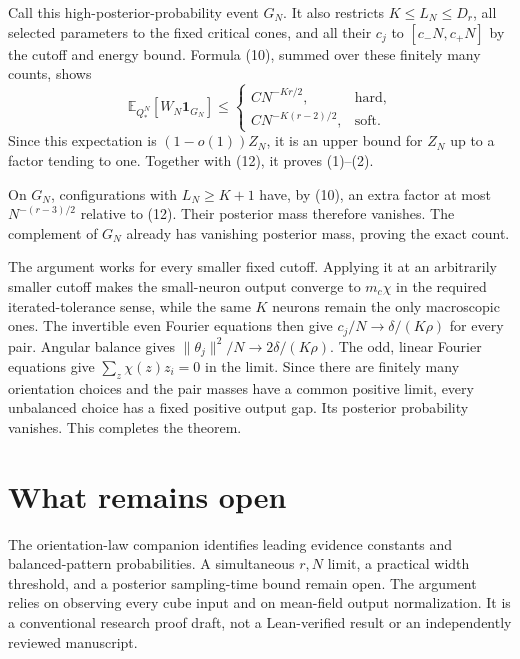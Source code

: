 \documentclass[11pt]{article}
\newcommand{\E}{\mathbb E}\newcommand{\Pp}{\mathbb P}
\newcommand{\one}{\mathbf1}
\begin{document}
Call this high-posterior-probability event $G_N$. It also restricts
$K\le L_N\le D_r$, all selected parameters to the fixed critical
cones, and all their $c_j$ to $[c_-N,c_+N]$ by the cutoff and energy
bound. Formula (10), summed over these finitely many counts, shows
\[
 \E_{Q_*^N}[W_N\one_{G_N}]\le
 \begin{cases}
 CN^{-Kr/2},&\text{hard},\\
 CN^{-K(r-2)/2},&\text{soft}.
 \end{cases}
\]
Since this expectation is $(1-o(1))Z_N$, it is an upper bound for
$Z_N$ up to a factor tending to one. Together with (12), it proves
(1)--(2).

On $G_N$, configurations with $L_N\ge K+1$ have, by (10), an extra
factor at most $N^{-(r-3)/2}$ relative to (12). Their posterior mass
therefore vanishes. The complement of $G_N$ already has vanishing
posterior mass, proving the exact count.

The argument works for every smaller fixed cutoff. Applying it at an
arbitrarily smaller cutoff makes the small-neuron output converge to
$m_c\chi$ in the required iterated-tolerance sense, while the same
$K$ neurons remain the only macroscopic ones. The invertible even
Fourier equations then give $c_j/N\to\delta/(K\rho)$ for every
pair. Angular balance gives $\|\theta_j\|^2/N\to2\delta/(K\rho)$.
The odd, linear Fourier equations give
$\sum_z\chi(z)z_i=0$ in the limit. Since there are finitely many
orientation choices and the pair masses have a common positive limit,
every unbalanced choice has a fixed positive output gap. Its posterior
probability vanishes. This completes the theorem.

\section{What remains open}
The orientation-law companion identifies leading evidence constants and
balanced-pattern probabilities. A simultaneous $r,N$ limit, a practical
width threshold, and a posterior sampling-time bound remain open.
The argument relies on observing every cube input
and on mean-field output normalization. It is a conventional research
proof draft, not a Lean-verified result or an independently reviewed
manuscript.
\end{document}
